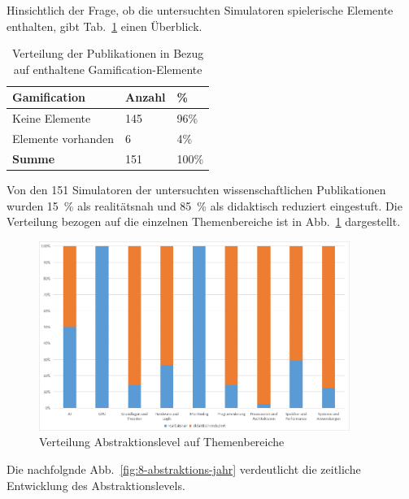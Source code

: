Hinsichtlich der Frage, ob die untersuchten Simulatoren spielerische Elemente enthalten, gibt Tab.~\ref{tab:gamification} einen Überblick.

\begin{table}[!htbp]
    \centering
    \caption{Verteilung der Publikationen in Bezug auf enthaltene Gamification-Elemente}
    \label{tab:gamification}
    \tiny
    \begin{tabularx}{\textwidth}{lXX}
        \hline
        \textbf{Gamification} & \textbf{Anzahl} & \textbf{\%} \\
        \hline
        Keine Elemente     & 145 & 96\% \\
        Elemente vorhanden & 6   & 4\%  \\
        \hline
        \textbf{Summe}     & 151 & 100\% \\
        \hline
    \end{tabularx}
\end{table}

Von den 151 Simulatoren der untersuchten wissenschaftlichen Publikationen wurden 15~\% als realitätsnah und 85~\% als didaktisch reduziert eingestuft. Die Verteilung bezogen auf die einzelnen Themenbereiche ist in Abb.~\ref{fig:7-abstraktion-themen} dargestellt.

\begin{figure}[!htbp]
    \centering
    \caption{Verteilung Abstraktionslevel auf Themenbereiche}
    \label{fig:7-abstraktion-themen}
    \includegraphics[width=0.90\textwidth]{graphics/7-abtraktion-themen.png}
\end{figure}

Die nachfolgnde Abb.~\ref{fig:8-abstraktions-jahr} verdeutlicht die zeitliche Entwicklung des Abstraktionslevels.

